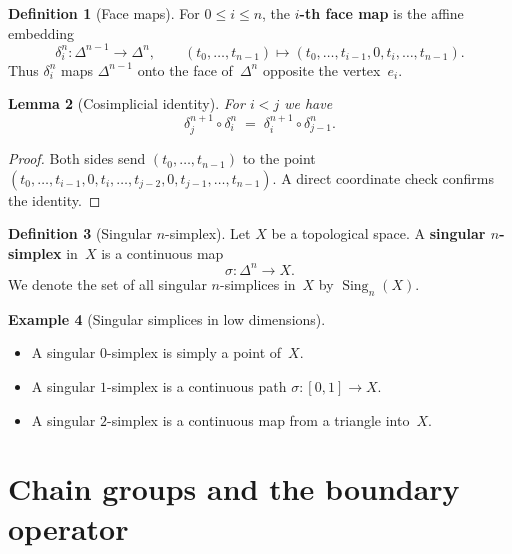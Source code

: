\documentclass[12pt,a4paper,openany]{book}
\theoremstyle{definition}
\newtheorem{definition}{Definition}[chapter]
\newtheorem{example}[definition]{Example}
\theoremstyle{plain}
\newtheorem{lemma}[definition]{Lemma}
\theoremstyle{remark}
\begin{document}
\begin{definition}[Face maps]\label{def:face-maps}
For $0\le i\le n$, the \textbf{$i$-th face map} is the affine embedding
\[
  \delta_i^n \colon \Delta^{n-1}\longrightarrow \Delta^n,
  \qquad
  (t_0,\dots,t_{n-1})\longmapsto (t_0,\dots,t_{i-1},0,t_i,\dots,t_{n-1}).
\]
Thus $\delta_i^n$ maps $\Delta^{n-1}$ onto the face of~$\Delta^n$ opposite
the vertex~$e_i$.
\end{definition}

\begin{lemma}[Cosimplicial identity]\label{lem:cosimplicial}
For $i<j$ we have
\[
  \delta_j^{n+1}\circ\delta_i^n
  \;=\;
  \delta_i^{n+1}\circ\delta_{j-1}^n.
\]
\end{lemma}

\begin{proof}
Both sides send $(t_0,\dots,t_{n-1})$ to the point
$(t_0,\dots,t_{i-1},0,t_i,\dots,t_{j-2},0,t_{j-1},\dots,t_{n-1})$.
A direct coordinate check confirms the identity.
\end{proof}

\begin{definition}[Singular $n$-simplex]\label{def:singular-simplex}
Let $X$ be a topological space.  A \textbf{singular $n$-simplex} in~$X$ is
a continuous map
\[
  \sigma \colon \Delta^n \longrightarrow X.
\]
We denote the set of all singular $n$-simplices in~$X$ by $\operatorname{Sing}_n(X)$.
\end{definition}

\begin{example}[Singular simplices in low dimensions]\label{ex:low-dim-simplices}
\begin{itemize}[leftmargin=2em]
  \item A singular $0$-simplex is simply a point of~$X$.
  \item A singular $1$-simplex is a continuous path
    $\sigma\colon [0,1]\to X$.
  \item A singular $2$-simplex is a continuous map from a triangle into~$X$.
\end{itemize}
\end{example}

\section{Chain groups and the boundary operator}\label{sec:chain-groups}
\end{document}
